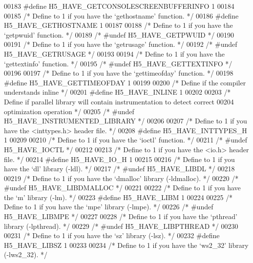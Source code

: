 \begin{DoxyCode}
{00183 \textcolor{preprocessor}{#define H5\_HAVE\_GETCONSOLESCREENBUFFERINFO 1}
00184 
00185 \textcolor{comment}{/* Define to 1 if you have the `gethostname' function. */}
00186 \textcolor{preprocessor}{#define H5\_HAVE\_GETHOSTNAME 1}
00187 
00188 \textcolor{comment}{/* Define to 1 if you have the `getpwuid' function. */}
00189 \textcolor{comment}{/* #undef H5\_HAVE\_GETPWUID */}
00190 
00191 \textcolor{comment}{/* Define to 1 if you have the `getrusage' function. */}
00192 \textcolor{comment}{/* #undef H5\_HAVE\_GETRUSAGE */}
00193 
00194 \textcolor{comment}{/* Define to 1 if you have the `gettextinfo' function. */}
00195 \textcolor{comment}{/* #undef H5\_HAVE\_GETTEXTINFO */}
00196 
00197 \textcolor{comment}{/* Define to 1 if you have the `gettimeofday' function. */}
00198 \textcolor{preprocessor}{#define H5\_HAVE\_GETTIMEOFDAY 1}
00199 
00200 \textcolor{comment}{/* Define if the compiler understands inline */}
00201 \textcolor{preprocessor}{#define H5\_HAVE\_INLINE 1}
00202 
00203 \textcolor{comment}{/* Define if parallel library will contain instrumentation to detect correct}
00204 \textcolor{comment}{   optimization operation */}
00205 \textcolor{comment}{/* #undef H5\_HAVE\_INSTRUMENTED\_LIBRARY */}
00206 
00207 \textcolor{comment}{/* Define to 1 if you have the <inttypes.h> header file. */}
00208 \textcolor{preprocessor}{#define H5\_HAVE\_INTTYPES\_H 1}
00209 
00210 \textcolor{comment}{/* Define to 1 if you have the `ioctl' function. */}
00211 \textcolor{comment}{/* #undef H5\_HAVE\_IOCTL */}
00212 
00213 \textcolor{comment}{/* Define to 1 if you have the <io.h> header file. */}
00214 \textcolor{preprocessor}{#define H5\_HAVE\_IO\_H 1}
00215 
00216 \textcolor{comment}{/* Define to 1 if you have the `dl' library (-ldl). */}
00217 \textcolor{comment}{/* #undef H5\_HAVE\_LIBDL */}
00218 
00219 \textcolor{comment}{/* Define to 1 if you have the `dmalloc' library (-ldmalloc). */}
00220 \textcolor{comment}{/* #undef H5\_HAVE\_LIBDMALLOC */}
00221 
00222 \textcolor{comment}{/* Define to 1 if you have the `m' library (-lm). */}
00223 \textcolor{preprocessor}{#define H5\_HAVE\_LIBM 1}
00224 
00225 \textcolor{comment}{/* Define to 1 if you have the `mpe' library (-lmpe). */}
00226 \textcolor{comment}{/* #undef H5\_HAVE\_LIBMPE */}
00227 
00228 \textcolor{comment}{/* Define to 1 if you have the `pthread' library (-lpthread). */}
00229 \textcolor{comment}{/* #undef H5\_HAVE\_LIBPTHREAD */}
00230 
00231 \textcolor{comment}{/* Define to 1 if you have the `sz' library (-lsz). */}
00232 \textcolor{preprocessor}{#define H5\_HAVE\_LIBSZ 1}
00233 
00234 \textcolor{comment}{/* Define to 1 if you have the `ws2\_32' library (-lws2\_32). */}
}
\end{DoxyCode}
